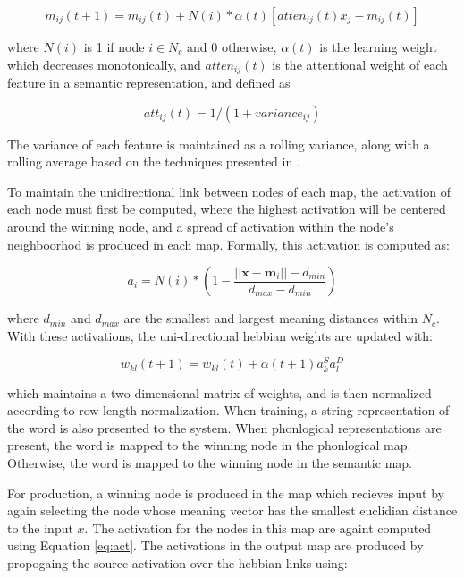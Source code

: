 \documentclass[a4paper,11pt]{article}
\begin{document}
{\small \begin{equation}\label{eq:meaning_weight}
m_{ij}(t+1) = m_{ij}(t) + N(i)*\alpha(t)[atten_{ij}(t)x_j - m_{ij}(t)]
\end{equation} }

where $N(i)$ is 1 if node $i \in N_c$ and 0 otherwise, $\alpha(t)$ is the
learning weight which decreases monotonically, and $atten_{ij}(t)$ is the
attentional weight of each feature in a semantic representation, and defined as

\begin{equation}\label{eq:atten}
att_{ij}(t) = 1 / (1 + variance_{ij})
\end{equation}

The variance of each feature is maintained as a rolling variance, along with a
rolling average based on the techniques presented in
\cite{mints93rollingvariance}.

To maintain the unidirectional link between nodes of each map, the activation of
each node must first be computed, where the highest activation will be centered
around the winning node, and a spread of activation within the node's
neighboorhod is produced in each map.  Formally, this activation is computed as:

\begin{equation}\label{eq:act}
a_i = N(i)*(1 - \frac{||\textbf{x} - \textbf{m$_i$}|| - d_{min} }{d_{max} -
d_{min}})
\end{equation}

where $d_{min}$ and $d_{max}$ are the smallest and largest meaning distances
within $N_c$.  With these activations, the uni-directional hebbian weights are
updated with:

\begin{equation}\label{eq:heb_weight}
w_{kl}(t+1) = w_{kl}(t) + \alpha(t+1)a_k^Sa_l^D
\end{equation}

which maintains a two dimensional matrix of weights, and is then normalized
according to row length normalization.  When training, a string representation
of the word is also presented to the system.  When phonlogical representations
are present, the word is mapped to the winning node in the phonlogical map.
Otherwise, the word is mapped to the winning node in the semantic map.

For production, a winning node is produced in the map which recieves input by
again selecting the node whose meaning vector has the smallest euclidian
distance to the input $x$.  The activation for the nodes in this map are againt
computed using Equation \ref{eq:act}.  The activations in the output map are
produced by propogaing the source activation over the hebbian links using:
\end{document}
